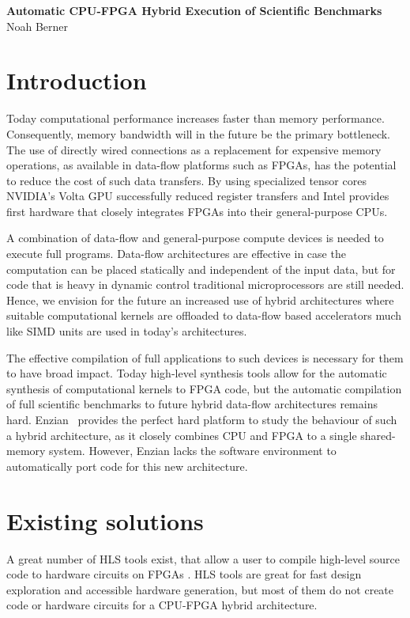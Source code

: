 \documentclass[12pt]{article}
\begin{document}
\begingroup  
  \centering
  \LARGE \textbf{
Automatic CPU-FPGA Hybrid Execution of
Scientific Benchmarks
}\\
  \large Noah Berner\par
\endgroup

\section*{Introduction}
Today computational performance increases faster than memory performance.
Consequently, memory bandwidth will in the future be the primary bottleneck.
The use of directly wired connections as a replacement for expensive memory
operations, as available in data-flow platforms such as FPGAs, has the
potential to reduce the cost of such data transfers. By using specialized
tensor cores NVIDIA's Volta GPU successfully reduced register transfers
and Intel provides first hardware that closely integrates FPGAs into their
general-purpose CPUs.

A combination of data-flow and general-purpose compute devices is needed to
execute full programs. Data-flow architectures are effective in case the
computation can be placed statically and independent of the input data, but
for code that is heavy in dynamic control traditional microprocessors are still
needed. Hence, we envision for the future an increased use of hybrid
architectures where suitable computational kernels are offloaded to data-flow
based accelerators much like SIMD units are used in today's architectures.

The effective compilation of full applications to such devices is necessary
for them to have broad impact. Today high-level synthesis tools allow for
the automatic synthesis of computational kernels to FPGA code, but the
automatic compilation of full scientific benchmarks to future hybrid
data-flow architectures remains hard. Enzian~\cite{Enzian} provides the
perfect hard platform to study the behaviour of such a hybrid architecture, as
it closely combines CPU and FPGA to a single shared-memory system. However,
Enzian lacks the software environment to automatically port code for this new
architecture.
\section*{Existing solutions}
A great number of HLS tools exist, that allow a user to compile high-level source code to hardware circuits on FPGAs \cite{HLS_overview}. HLS tools are great for fast design exploration and accessible hardware generation, but most of them do not create code or hardware circuits for a CPU-FPGA hybrid architecture.
\end{document}
